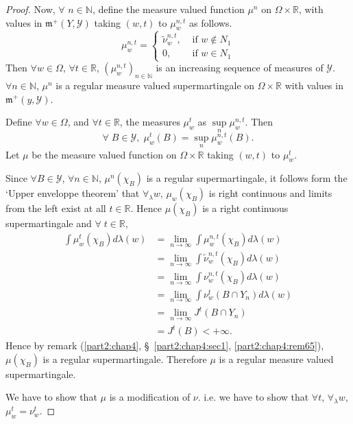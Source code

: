 \begin{proof}
Now, $\forall $ $n \in \mathbb{N}$, define the measure valued function
$\mu^n$ on $\Omega \times \mathbb{R}$, with values in $\mathfrak{m}^+
(Y, \mathscr{Y})$ taking $(w,t)$ to $\mu^{n,t}_w $ as follows. 
$$
\mu^{n,t}_w =
\begin{cases}
\tilde{\nu}^{n,t}_w , & \text{ if } w \not\in N_1\\
0, & \text{ if } w \in N_1
\end{cases}
$$\pageoriginale 
Then $\forall w \in\Omega$, $\forall t \in\mathbb{R}$,
$(\mu^{n,t}_w)_{n \in \mathbb{N}}$ is an increasing sequence of
measures of $\mathscr{Y}$. $\forall n \in\mathbb{N}$, $\mu^n$ is a
regular measure valued supermartingale on $\Omega \times \mathbb{R}$
with values in $\mathfrak{m}^+ (y, \mathscr{Y})$. 

Define $\forall w \in \Omega$, and $\forall t \in\mathbb{R}$, the
measures $\mu^t_w$ as $\sup\limits_n \mu^{n,t}_w$. Then
$$
\forall \; B \in \mathscr{Y}, \;\mu^t_w(B) = \sup\limits_n
\mu^{n,t}_w(B). 
$$
Let $\mu$ be the measure valued function on $\Omega \times \mathbb{R}$
taking $(w,t)$ to $\mu^t_w$. 

Since $\forall B \in \mathscr{Y}$, $\forall n \in \mathbb{N}$,
$\mu^n(\chi_B)$ is a regular supermartingale, it follows form the
`Upper enveloppe theorem' that $\forall_\lambda w$, $\mu_w(\chi_B)$ is
right continuous and limits from the left exist at all $t \in
\mathbb{R}$. Hence $\mu(\chi_B)$ is a right continuous supermartingale
and $\forall\; t \in \mathbb{R}$, 
\begin{align*}
\int \mu^t_w(\chi_B) d\lambda(w) & = \lim\limits_{n \to \infty} \int
\mu^{n,t}_w(\chi_B) d \lambda(w)\\
& = \lim\limits_{n \to \infty} \int \tilde{\nu}^{n,t}_w(\chi_B)
d\lambda(w)\\
& = \lim\limits_{n \to \infty} \int \nu^{n,t}_w(\chi_B) d\lambda(w)\\
& = \lim\limits_{n \to \infty} \int \nu^t_w(B\cap Y_n) d\lambda(w)\\
& = \lim\limits_{n \to \infty} J^t (B \cap Y_n)\\
& = J^t (B) <+ \infty. 
\end{align*}
Hence by remark (\ref{part2:chap4}, \S\ \ref{part2:chap4:sec1},
\ref{part2:chap4:rem65}), $\mu(\chi_B)$ is a regular
supermartingale. Therefore $\mu$ is a regular measure valued
supermartingale. 

We have to show that $\mu$ is a modification of $\nu$. i.e. we have to
show that $\forall t$, $\forall_\lambda w$, $\mu^t_w = \nu^t_w$. 



\end{proof}

